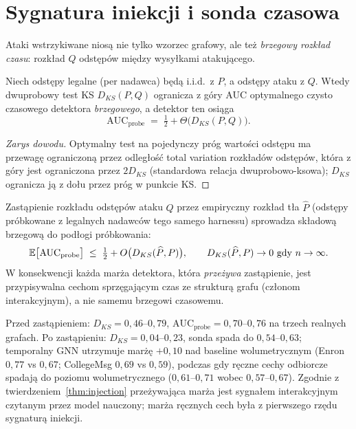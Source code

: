 \chapter{Sygnatura iniekcji i sonda czasowa}
\label{sec:injection}

Ataki wstrzykiwane niosą nie tylko wzorzec grafowy, ale też
\emph{brzegowy rozkład czasu}: rozkład $Q$ odstępów między wysyłkami
atakującego.

\begin{lemma}
\label{lem:probe}
Niech odstępy legalne (per nadawca) będą i.i.d.\ z $P$, a odstępy ataku
z $Q$. Wtedy dwuprobowy test KS $D_{KS}(P,Q)$ ogranicza z góry AUC
optymalnego czysto czasowego detektora \emph{brzegowego}, a detektor ten
osiąga
\[
\mathrm{AUC}_{\mathrm{probe}} \;=\; \tfrac12 + \Theta\big(D_{KS}(P,Q)\big).
\]
\end{lemma}

\begin{proof}[Zarys dowodu]
Optymalny test na pojedynczy próg wartości odstępu ma przewagę
ograniczoną przez odległość total variation rozkładów odstępów,
która z góry jest ograniczona przez $2D_{KS}$ (standardowa relacja
dwuprobowo-ksowa); $D_{KS}$ ogranicza ją z dołu przez próg w punkcie KS.
\end{proof}

\begin{theorem}
\label{thm:injection}
Zastąpienie rozkładu odstępów ataku $Q$ przez empiryczny rozkład tła
$\widehat P$ (odstępy próbkowane z legalnych nadawców tego samego
harnessu) sprowadza składową brzegową do podłogi próbkowania:
\[
\mathbb{E}\big[\mathrm{AUC}_{\mathrm{probe}}\big] \;\le\; \tfrac12 +
O\big(D_{KS}(\widehat P, P)\big),
\qquad D_{KS}(\widehat P,P)\to 0 \text{ gdy } n\to\infty.
\]
W konsekwencji każda marża detektora, która \emph{przeżywa} zastąpienie,
jest przypisywalna cechom sprzęgającym czas ze strukturą grafu
(członom interakcyjnym), a nie samemu brzegowi czasowemu.
\end{theorem}

\begin{remark}
Przed zastąpieniem: $D_{KS}=0{,}46$--$0{,}79$,
$\mathrm{AUC}_{\mathrm{probe}}=0{,}70$--$0{,}76$ na trzech realnych
grafach. Po zastąpieniu: $D_{KS}=0{,}04$--$0{,}23$, sonda spada do
$0{,}54$--$0{,}63$; temporalny GNN utrzymuje marżę $+0{,}10$ nad
baseline wolumetrycznym (Enron $0{,}77$ vs $0{,}67$; CollegeMsg
$0{,}69$ vs $0{,}59$), podczas gdy ręczne cechy odbiorcze spadają do
poziomu wolumetrycznego ($0{,}61$--$0{,}71$ wobec $0{,}57$--$0{,}67$).
Zgodnie z twierdzeniem~\ref{thm:injection} przeżywająca marża jest
sygnałem interakcyjnym czytanym przez model nauczony; marża ręcznych
cech była z pierwszego rzędu sygnaturą iniekcji.
\end{remark}

